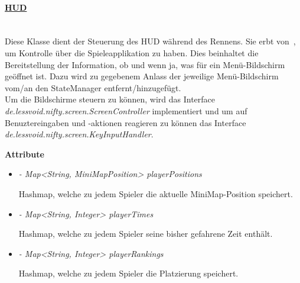        

        \paragraph{\underline{HUD}} \mbox{}\\
            Diese Klasse dient der Steuerung des HUD
            während des Rennens. Sie erbt von~, um Kontrolle über die 
            Spieleapplikation zu haben. Dies beinhaltet  die Bereitstellung der
            Information, ob und wenn ja, was für ein Menü-Bildschirm geöffnet ist.
            Dazu wird zu gegebenem Anlass der jeweilige Menü-Bildschirm vom/an den
            StateManager entfernt/hinzugefügt.\\
            Um die Bildschirme steuern zu können, wird das Interface
            \textit{de.lessvoid.nifty.screen.ScreenController} implementiert und um auf
            Benuztereingaben und -aktionen reagieren zu können das Interface
            \textit{de.lessvoid.nifty.screen.KeyInputHandler}. \par
            
            \textbf{Attribute}
            \begin{itemize}
                \item \textit{- Map<String, MiniMapPosition> playerPositions}  
                    \begin{leftbar}[0.9\linewidth]
                        Hashmap, welche zu jedem Spieler die aktuelle MiniMap-Position speichert.
                    \end{leftbar}
                \item  \textit{- Map<String, Integer> playerTimes} 
                    \begin{leftbar}[0.9\linewidth]
                        Hashmap, welche zu jedem Spieler seine bisher gefahrene Zeit enthält.
                    \end{leftbar}
                \item  \textit{- Map<String, Integer> playerRankings} 
                    \begin{leftbar}[0.9\linewidth]
                        Hashmap, welche zu jedem Spieler die Platzierung speichert.
                    \end{leftbar}
            \end{itemize}
               
